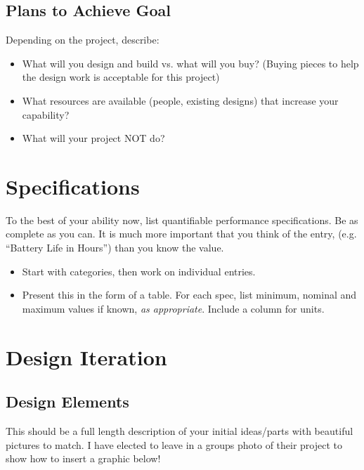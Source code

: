 \documentclass[12pt]{article}
\begin{document}
\subsection{Plans to Achieve Goal}
Depending on the project, describe:
\begin{itemize}

\item What will you design and build vs. what will you buy? (Buying pieces to help the design work is acceptable for this project)

\item What resources are available (people, existing designs) that increase your capability?

\item What will your project NOT do?

\end{itemize}

\newpage

\section{Specifications}

To the best of your ability now, list quantifiable performance specifications. Be as complete as you can. It is much more important that you think of the entry, (e.g. “Battery Life in Hours”) than you know the value.


\begin{itemize}

    \item Start with categories, then work on individual entries.

    \item Present this in the form of a table. For each spec, list minimum, nominal and maximum values if known, \textit{as appropriate}. Include a column for units.

\end{itemize}

\newpage

\section{Design Iteration}

\subsection{Design Elements}
This should be a full length description of your initial ideas/parts with beautiful pictures to match. I have elected to leave in a groups photo of their project to show how to insert a graphic below!
\end{document}

